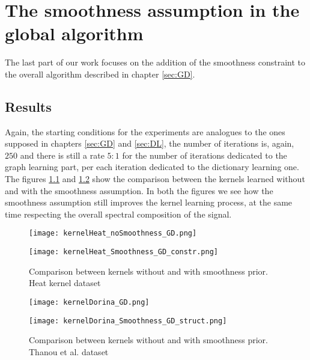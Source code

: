 \chapter{The smoothness assumption in the global algorithm}
The last part of our work focuses on the addition of the smoothness constraint to the overall algorithm described in chapter \ref{sec:GD}.
\section{Results}
Again, the starting conditions for the experiments are analogues to the ones supposed in chapters \ref{sec:GD} and \ref{sec:DL}, the number of iterations is, again, $250$ and there is still a rate $5:1$ for the number of iterations dedicated to the graph learning part, per each iteration dedicated to the dictionary learning one.
\\

The figures \ref{fig:alphaHeatGD_smth} and \ref{fig:alphaDorinaGD_smth} show the comparison between the kernels learned without and with the smoothness assumption. In both the figures we see how the smoothness assumption still improves the kernel learning process, at the same time respecting the overall spectral composition of the signal.

\begin{figure}
  \centering
  \begin{minipage}[c]{.8\textwidth}
    \centering
    \texttt{[image: kernelHeat\_noSmoothness\_GD.png]}
  \end{minipage}
  \begin{minipage}[c]{.8\textwidth}
    \centering
    \texttt{[image: kernelHeat\_Smoothness\_GD\_constr.png]}
  \end{minipage}
  \caption{Comparison between kernels without and with smoothness prior. Heat kernel dataset}
  \label{fig:alphaHeatGD_smth}
\end{figure}

\begin{figure}
  \centering
  \begin{minipage}[c]{.8\textwidth}
    \centering
    \texttt{[image: kernelDorina\_GD.png]}
  \end{minipage}
  \begin{minipage}[c]{.8\textwidth}
    \centering
    \texttt{[image: kernelDorina\_Smoothness\_GD\_struct.png]}
  \end{minipage}
  \caption{Comparison between kernels without and with smoothness prior. Thanou et al. dataset}
  \label{fig:alphaDorinaGD_smth}
\end{figure}

